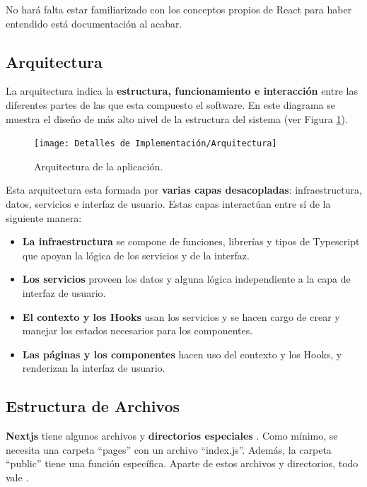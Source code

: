 \documentclass[12pt,twoside,titlepage]{report}
\begin{document}
No hará falta estar familiarizado con los conceptos propios de React para haber entendido está documentación al acabar.

\subsection{Arquitectura}
\label{sec:arquitectura}

La arquitectura indica la \textbf{estructura, funcionamiento e interacción} entre las diferentes partes de las que esta compuesto el software. En este diagrama se muestra el diseño de más alto nivel de la estructura del sistema (ver Figura \ref{fig:Arquitectura}).

\begin{figure}[H]
    \centering
    \texttt{[image: Detalles de Implementación/Arquitectura]}
    \caption{Arquitectura de la aplicación.}
    \label{fig:Arquitectura}
\end{figure}

Esta arquitectura esta formada por \textbf{varias capas desacopladas}: infraestructura, datos, servicios e interfaz de usuario. Estas capas interactúan entre sí de la siguiente manera:

\begin{itemize}
    \item \textbf{La infraestructura} se compone de funciones, librerías y tipos de Typescript que apoyan la lógica de los servicios y de la interfaz.
    \item \textbf{Los servicios} proveen los datos y alguna lógica independiente a la capa de interfaz de usuario.
    \item \textbf{El contexto y los Hooks} usan los servicios y se hacen cargo de crear y manejar los estados necesarios para los componentes.
    \item \textbf{Las páginas y los componentes} hacen uso del contexto y los Hooks, y renderizan la interfaz de usuario.
\end{itemize}

\subsection{Estructura de Archivos}
\label{sec:archivos}

\textbf{Nextjs} tiene algunos archivos y \textbf{directorios especiales} \cite{reactArchivos}. Como mínimo, se necesita una carpeta ``pages'' con un archivo ``index.js''. Además, la carpeta ``public'' tiene una función específica. Aparte de estos archivos y directorios, todo vale \cite{nextjs2}.
\end{document}

